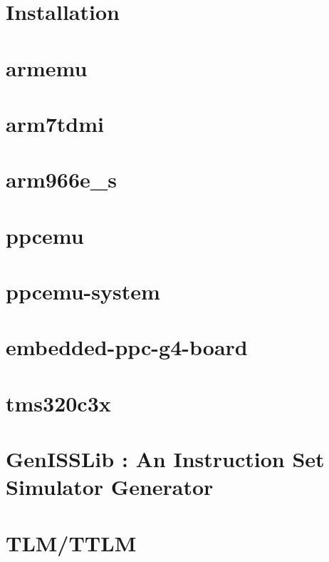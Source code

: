 \documentclass[a4paper,11pt,onecolumn]{mathese}
\begin{document}
\chapter{Installation}
\label{installation}


\chapter{armemu}
\label{armemu}


\chapter{arm7tdmi}
\label{arm7tdmi}


\chapter{arm966e\_s}
\label{arm966e_s}


\chapter{ppcemu}
\label{ppcemu}


\chapter{ppcemu-system}
\label{ppcemu_system}


\chapter{embedded-ppc-g4-board}
\label{embedded_ppc_g4_board}


\chapter{tms320c3x}
\label{tms320c3x}


\chapter{GenISSLib : An Instruction Set Simulator Generator}
\label{genisslib}


\chapter{TLM/TTLM}
\label{tlm_ttlm}

\end{document}
